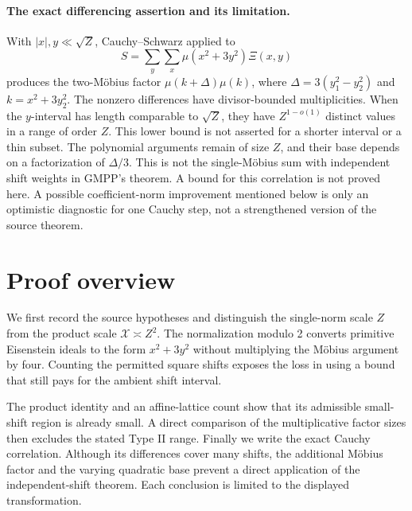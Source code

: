 \documentclass[11pt]{article}
\begin{document}
\paragraph{The exact differencing assertion and its limitation.}
With \(|x|,y\ll\sqrt Z\), Cauchy--Schwarz applied to
\[
 S=\sum_y\sum_x \mu(x^2+3y^2)\Xi(x,y)
\]
produces the two-Möbius factor
\(\mu(k+\Delta)\mu(k)\), where
\(\Delta=3(y_1^2-y_2^2)\) and \(k=x^2+3y_2^2\).
The nonzero differences have divisor-bounded multiplicities.
When the \(y\)-interval has length comparable to \(\sqrt Z\),
they have \(Z^{1-o(1)}\) distinct values in a range of order \(Z\).
This lower bound is not asserted for a shorter interval or a thin subset.
The polynomial arguments remain of size \(Z\), and their base
depends on a factorization of \(\Delta/3\). This is not the
single-Möbius sum with independent shift weights in GMPP's theorem.
A bound for this correlation is not proved here.
A possible coefficient-norm improvement mentioned below is
only an optimistic diagnostic for one Cauchy step,
not a strengthened version of the source theorem.

\section{Proof overview}
We first record the source hypotheses and distinguish the single-norm
scale \(Z\) from the product scale \(\mathcal X\asymp Z^2\).
The normalization modulo 2 converts primitive Eisenstein ideals
to the form \(x^2+3y^2\) without multiplying the Möbius argument
by four. Counting the permitted square shifts exposes the loss
in using a bound that still pays for the ambient shift interval.

The product identity and an affine-lattice count
show that its admissible small-shift region is already small.
A direct comparison of the multiplicative factor sizes then
excludes the stated Type II range. Finally we write the exact
Cauchy correlation. Although its differences cover many shifts,
the additional Möbius factor and the varying quadratic base
prevent a direct application of the independent-shift theorem.
Each conclusion is limited to the displayed transformation.


\end{document}
